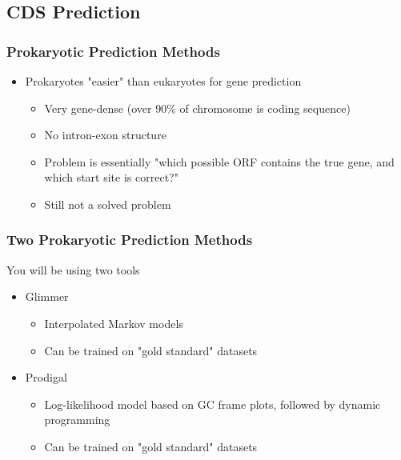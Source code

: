 \documentclass[table]{beamer}
\begin{document}
    \subsection{CDS Prediction}
    \begin{frame}
     \frametitle{Prokaryotic Prediction Methods}
     \begin{itemize}
       \item Prokaryotes "easier" than eukaryotes for gene prediction
       \begin{itemize}
         \item Very gene-dense (over 90\% of chromosome is coding sequence)
         \item No intron-exon structure
         \item Problem is essentially "which possible ORF contains the true gene, and which start site is correct?"
         \item Still not a solved problem
       \end{itemize}       
     \end{itemize}
    \end{frame}  



    \begin{frame}
     \frametitle{Two Prokaryotic Prediction Methods}
     You will be using two tools
     \begin{itemize}
       \item Glimmer
       \begin{itemize}
         \item Interpolated Markov models
         \item Can be trained on "gold standard" datasets
       \end{itemize}
       \item Prodigal
       \begin{itemize}
         \item Log-likelihood model based on GC frame plots, followed by dynamic programming
         \item Can be trained on "gold standard" datasets
       \end{itemize}
     \end{itemize}
    \end{frame}  
\end{document}
